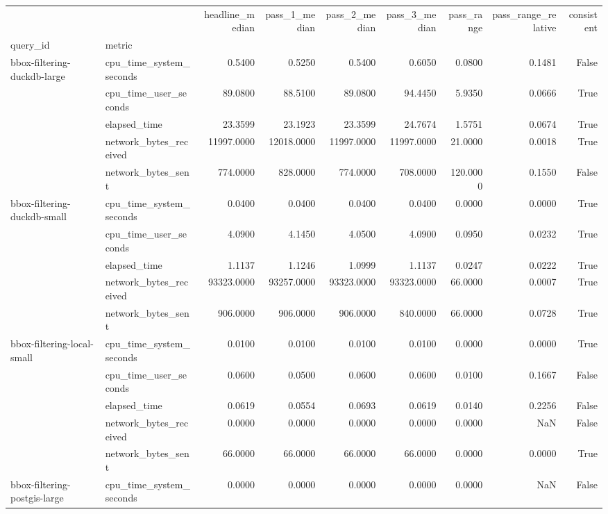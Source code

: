 \begin{tabular}{llrrrrrrr}
\toprule
 &  & headline\_median & pass\_1\_median & pass\_2\_median & pass\_3\_median & pass\_range & pass\_range\_relative & consistent \\
query\_id & metric &  &  &  &  &  &  &  \\
\midrule
\multirow[t]{5}{*}{bbox-filtering-duckdb-large} & cpu\_time\_system\_seconds & 0.5400 & 0.5250 & 0.5400 & 0.6050 & 0.0800 & 0.1481 & False \\
 & cpu\_time\_user\_seconds & 89.0800 & 88.5100 & 89.0800 & 94.4450 & 5.9350 & 0.0666 & True \\
 & elapsed\_time & 23.3599 & 23.1923 & 23.3599 & 24.7674 & 1.5751 & 0.0674 & True \\
 & network\_bytes\_received & 11997.0000 & 12018.0000 & 11997.0000 & 11997.0000 & 21.0000 & 0.0018 & True \\
 & network\_bytes\_sent & 774.0000 & 828.0000 & 774.0000 & 708.0000 & 120.0000 & 0.1550 & False \\
\cline{1-9}
\multirow[t]{5}{*}{bbox-filtering-duckdb-small} & cpu\_time\_system\_seconds & 0.0400 & 0.0400 & 0.0400 & 0.0400 & 0.0000 & 0.0000 & True \\
 & cpu\_time\_user\_seconds & 4.0900 & 4.1450 & 4.0500 & 4.0900 & 0.0950 & 0.0232 & True \\
 & elapsed\_time & 1.1137 & 1.1246 & 1.0999 & 1.1137 & 0.0247 & 0.0222 & True \\
 & network\_bytes\_received & 93323.0000 & 93257.0000 & 93323.0000 & 93323.0000 & 66.0000 & 0.0007 & True \\
 & network\_bytes\_sent & 906.0000 & 906.0000 & 906.0000 & 840.0000 & 66.0000 & 0.0728 & True \\
\cline{1-9}
\multirow[t]{5}{*}{bbox-filtering-local-small} & cpu\_time\_system\_seconds & 0.0100 & 0.0100 & 0.0100 & 0.0100 & 0.0000 & 0.0000 & True \\
 & cpu\_time\_user\_seconds & 0.0600 & 0.0500 & 0.0600 & 0.0600 & 0.0100 & 0.1667 & False \\
 & elapsed\_time & 0.0619 & 0.0554 & 0.0693 & 0.0619 & 0.0140 & 0.2256 & False \\
 & network\_bytes\_received & 0.0000 & 0.0000 & 0.0000 & 0.0000 & 0.0000 & NaN & False \\
 & network\_bytes\_sent & 66.0000 & 66.0000 & 66.0000 & 66.0000 & 0.0000 & 0.0000 & True \\
\cline{1-9}
\multirow[t]{5}{*}{bbox-filtering-postgis-large} & cpu\_time\_system\_seconds & 0.0000 & 0.0000 & 0.0000 & 0.0000 & 0.0000 & NaN & False \\

\end{tabular}
